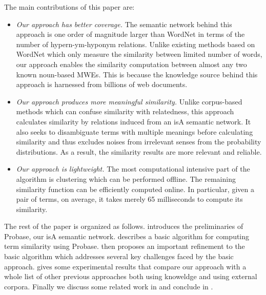 The main contributions of this paper are:
\begin{itemize}
\item {\em Our approach has better coverage.}
The semantic network behind this approach is one order of magnitude larger
than WordNet in terms of the number of hypern-ym-hyponym relations.
Unlike existing methods based on WordNet which only measure the similarity between limited number of words, our approach enables the similarity computation between almost any two
known noun-based MWEs. This is because the knowledge source behind this approach
is harnessed from billions of web documents.

\item {\em Our approach produces more meaningful similarity.}
Unlike corpus-based methods which can confuse similarity with relatedness,
this approach calculates similarity by relations induced from an isA semantic
network. It also seeks to disambiguate terms with multiple meanings before
calculating similarity and thus excludes noises from irrelevant senses from
the probability distributions. As a result, the similarity results
are more relevant and reliable.

\item {\em Our approach is lightweight.}  The most computational
  intensive part of the algorithm is clustering which can be performed
  offline. The remaining similarity function can be efficiently
  computed online. In particular, given a pair of terms, on average,
  it takes merely 65 milliseconds to compute its similarity.
\end{itemize}

The rest of the paper is organized as follows.  introduces
the preliminaries of Probase, our isA semantic network.
 describes a basic algorithm for computing term similarity
using Probase.  then proposes an important refinement to
the basic algorithm which addresses several key challenges faced by the basic
approach.
 gives some experimental results that compare our approach with
a whole list of other previous approaches both using knoweldge and using external
corpora. Finally we discuss some related work in  and
conclude in .

